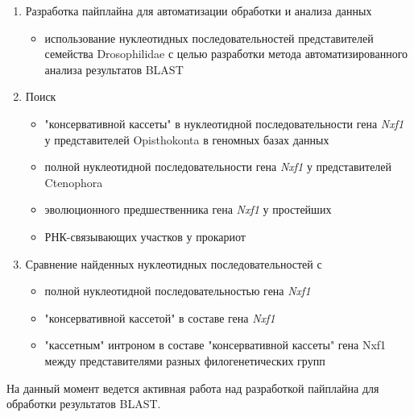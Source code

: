 \begin{enumerate}
    \item Разработка пайплайна для автоматизации обработки и анализа данных
    \begin{itemize}
        \item использование нуклеотидных последовательностей представителей семейства Drosophilidae с целью разработки метода автоматизированного анализа результатов BLAST
    \end{itemize}
    \item Поиск
    \begin{itemize}
        \item "консервативной кассеты" в нуклеотидной последовательности гена \textit{Nxf1} у представителей Opisthokonta в геномных базах данных
        \item полной нуклеотидной последовательности гена \textit{Nxf1} у представителей Ctenophora
        \item эволюционного предшественника гена \textit{Nxf1} у простейших
        \item РНК-связывающих участков у прокариот
    \end{itemize}
    \item Сравнение найденных нуклеотидных последовательностей с
    \begin{itemize}
        \item полной нуклеотидной последовательностью гена \textit{Nxf1}
        \item "консервативной кассетой" в составе гена \textit{Nxf1}
        \item "кассетным" интроном в составе "консервативной кассеты" гена Nxf1 между представителями разных филогенетических групп
    \end{itemize}
\end{enumerate}

На данный момент ведется активная работа над разработкой пайплайна для обработки результатов BLAST.
